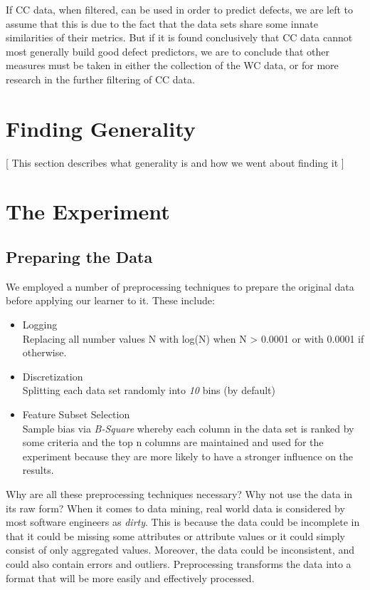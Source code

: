 \documentclass{sig-alternate}
\begin{document}
If CC data, when filtered, can be used in order to predict defects, we are left to assume that this is due to the fact that the data sets share some innate similarities of their metrics. But if it is found conclusively that CC data cannot most generally build good defect predictors, we are to conclude that other measures must be taken in either the collection of the WC data, or for more research in the further filtering of CC data. 
 

\section{Finding Generality}
[ This section describes what generality is and how we went about finding it ]
 

\section{The Experiment}
 
 
\subsection{Preparing the Data} 
We employed a number of preprocessing techniques to prepare the original data before applying our learner to it. These include: 
 
\begin{itemize} 
\item{Logging} 
\\Replacing all number values N with log(N) when N > 0.0001 or with 0.0001 if otherwise. 
\item{Discretization} 
\\Splitting each data set randomly into {\em 10} bins (by default) 
\item{Feature Subset Selection} 
\\Sample bias via {\em B-Square} whereby each column in the data set is ranked by some criteria and the top n columns are maintained and used for the experiment because they are more likely to have a stronger influence on the results. 
\end{itemize} 
Why are all these preprocessing techniques necessary? Why not use the data in its raw form? When it comes to data mining, real world data is considered by most software engineers as {\em dirty}. This is because the data could be incomplete in that it could be missing some attributes or attribute values or it could simply consist of only aggregated values. Moreover, the data could be inconsistent, and could also contain errors and outliers. Preprocessing transforms the data into a format that will be more easily and effectively processed.
 
\end{document}
